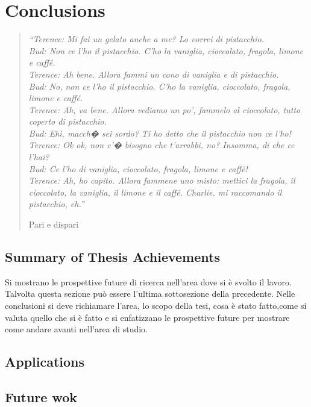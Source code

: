 \chapter{Conclusions }
\label{capitolo7}
\thispagestyle{empty}

\begin{quotation}
{\footnotesize
\noindent\emph{``Terence: Mi fai un gelato anche a me? Lo vorrei di pistacchio. \\
Bud: Non ce l'ho il pistacchio. C'ho la vaniglia, cioccolato, fragola, limone e caff\'e. \\
Terence: Ah bene. Allora fammi un cono di vaniglia e di pistacchio. \\
Bud: No, non ce l'ho il pistacchio. C'ho la vaniglia, cioccolato, fragola, limone e caff\'e. \\
Terence: Ah, va bene. Allora vediamo un po', fammelo al cioccolato, tutto coperto di pistacchio. \\
Bud: Ehi, macch� sei sordo? Ti ho detto che il pistacchio non ce l'ho! \\
Terence: Ok ok, non c'� bisogno che t'arrabbi, no? Insomma, di che ce l'hai? \\
Bud: Ce l'ho di vaniglia, cioccolato, fragola, limone e caff\'e! \\
Terence: Ah, ho capito. Allora fammene uno misto: mettici la fragola, il cioccolato, la vaniglia, il limone e il caff\'e. Charlie, mi raccomando il pistacchio, eh.''}
\begin{flushright}
Pari e dispari
\end{flushright}
}
\end{quotation}
\vspace{0.5cm}
\section{ Summary of Thesis Achievements}
\noindent Si mostrano le prospettive future di ricerca nell'area dove si \`e svolto il lavoro. Talvolta questa sezione pu\`o essere l'ultima sottosezione della precedente. Nelle conclusioni si deve richiamare l'area, lo scopo della tesi, cosa \`e stato fatto,come si valuta quello che si \`e fatto e si enfatizzano le prospettive future per mostrare come andare avanti nell'area di studio.

\section{ Applications}

\section{Future wok}